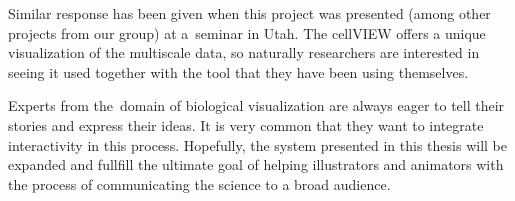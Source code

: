 \documentclass[
  digital, %
  table,   %
  nolof,     %
  nolot,     %
  oneside,
]{fithesis3}
\begin{document}
Similar response has been given when this project was presented (among other projects from our group) at a seminar in Utah. The cellVIEW offers a unique visualization of the multiscale data, so naturally researchers are interested in seeing it used together with the tool that they have been using themselves.

Experts from the domain of biological visualization are always eager to tell their stories and express their ideas. It is very common that they want to integrate interactivity in this process. Hopefully, the system presented in this thesis will be expanded and fullfill the ultimate goal of helping illustrators and animators with the process of communicating the science to a broad audience.


\newpage
\printbibliography[heading=bibintoc]

\end{document}
